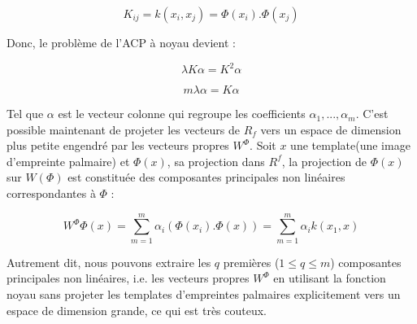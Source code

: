 \begin{center}
	\begin{equation}\label{eq:chapitre3eq11}
	K_{ij}=k(x_{i},x_{j})=\Phi (x_{i}).\Phi(x_{j})
	\end{equation}
\end{center}
Donc, le problème de l’ACP à noyau devient :
\begin{center}
	\begin{equation}\label{eq:chapitre3eq12}
	\lambda K\alpha=K^2 \alpha
	\end{equation}
\end{center}
\begin{center}
	\begin{equation}\label{eq:chapitre3eq13}
	m\lambda \alpha=K\alpha
	\end{equation}
\end{center}
Tel que $\alpha$ est le vecteur colonne qui regroupe les coefficients $\alpha _{1},...,\alpha _{m}$.
C’est possible maintenant de projeter les vecteurs de $R_{f}$ vers un espace de dimension plus petite engendré par les vecteurs propres $W^{\Phi }$.
Soit $x$ une template(une image d’empreinte palmaire) et $\Phi (x)$, sa projection dans $ R^{f} $, la projection de $\Phi (x)$ sur $W\left (\Phi \right)$ est constituée des composantes principales non linéaires correspondantes à $ \Phi $ :
\begin{center}
	\begin{equation}
	\label{eq:chapitre3eq14}
	W^{\Phi }\Phi(x)=\sum_{m=1}^{m}\alpha_{i}(\Phi(x_{i}).\Phi(x))=\sum_{m=1}^{m}\alpha_{i}k(x_1,x)
	\end{equation}
\end{center}
Autrement dit, nous pouvons extraire les $q$ premières ($1\leq q\leq m$) composantes principales non linéaires, i.e. les vecteurs propres $W^\Phi$ en utilisant la fonction noyau sans projeter les templates d’empreintes palmaires explicitement vers un espace de dimension grande, ce qui est très couteux.
